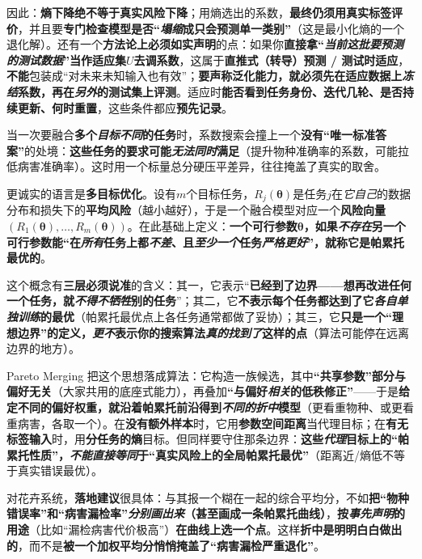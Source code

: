 因此：\textbf{熵下降\textbf{绝不等于}真实风险下降}；用熵选出的系数，\textbf{最终仍须用真实标签评价}，并且要\textbf{专门检查模型是否“\emph{塌缩}成只会预测单一类别”}（这是最小化熵的一个退化解）。还有一个\textbf{方法论上必须如实声明}的点：如果你\textbf{直接拿“\emph{当前这批要预测的测试数据}”当作适应集$U$去调系数}，这属于\textbf{直推式（转导）预测 / 测试时适应}，\textbf{不能}包装成“对未来未知输入也有效”；\textbf{要声称泛化能力，就必须先在适应数据上\emph{冻结}系数，再在\emph{另外}的测试集上评测}。适应时\textbf{能否看到任务身份、迭代几轮、是否持续更新、何时重置}，这些条件都应\textbf{预先记录}。

当一次要融合\textbf{多个\emph{目标不同}的任务}时，系数搜索会撞上一个\textbf{没有“唯一标准答案”}的处境：\textbf{这些任务的要求可能\emph{无法同时}满足}（提升物种准确率的系数，可能拉低病害准确率）。这时用一个标量总分硬压平差异，往往掩盖了真实的取舍。

更诚实的语言是\textbf{多目标优化}。设有$m$个目标任务，$R_j(\bm{\theta})$是任务$j$在\emph{它自己}的数据分布和损失下的\textbf{平均风险}（越小越好），于是一个融合模型对应一个\textbf{风险向量}$(R_1(\bm{\theta}),\ldots,R_m(\bm{\theta}))$。在此基础上定义：\textbf{一个可行参数$\bm{\theta}$，如果\emph{不存在}另一个可行参数能“在\emph{所有}任务上都\emph{不差}、且\emph{至少一个}任务\emph{严格更好}”，就称它是帕累托最优的}。

这个概念有\textbf{三层必须说准}的含义：其一，它表示“\textbf{已经到了边界——想再改进任何一个任务，就\emph{不得不牺牲}别的任务}”；其二，它\textbf{不表示每个任务都达到了它\emph{各自单独训练}的最优}（帕累托最优点上各任务通常都做了妥协）；其三，它\textbf{只是一个“理想边界”的定义，\emph{更不}表示你的搜索算法\emph{真的找到了}这样的点}（算法可能停在远离边界的地方）。

Pareto Merging 把这个思想落成算法：它构造一族候选，其中\textbf{“共享参数”部分与偏好无关}（大家共用的底座式能力），再叠加\textbf{“与偏好\emph{相关}的低秩修正”}——于是\textbf{给定不同的偏好权重，就沿着帕累托前沿得到\emph{不同的折中}模型}（更看重物种、或更看重病害，各取一个）。在\textbf{没有额外样本}时，它用\textbf{参数空间距离}当代理目标；在\textbf{有无标签输入}时，用\textbf{分任务的熵}目标。但同样要守住那条边界：\textbf{这些\emph{代理}目标上的“帕累托性质”，\emph{不能直接等同}于“真实风险上的全局帕累托最优”}（距离近/熵低不等于真实错误最优）。

对花卉系统，\textbf{落地建议}很具体：与其报一个糊在一起的综合平均分，不如\textbf{把“物种错误率”和“病害漏检率”\emph{分别画出来}（甚至画成一条帕累托曲线）}，\textbf{按\emph{事先声明}的用途}（比如“漏检病害代价极高”）\textbf{在曲线上选一个点}。这样\textbf{折中是明明白白做出的}，而不是\textbf{被一个加权平均分悄悄掩盖了“病害漏检严重退化”}。

